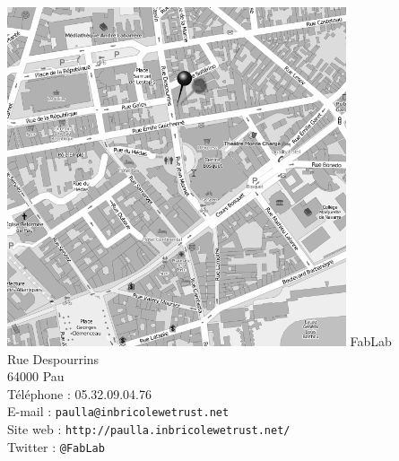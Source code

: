 \begin{center}
  \vfill
  \includegraphics[width=10cm]{carte.png}
  \vfill
  FabLab\\
  Rue Despourrins\\
  64000 Pau\\
  \vfill
  \medskip Téléphone : 05.32.09.04.76\\ %
  \medskip E-mail : \texttt{paulla@inbricolewetrust.net}\\%
  \medskip Site web : \texttt{http://paulla.inbricolewetrust.net/}\\%
  \medskip Twitter : \texttt{@FabLab}
  \vfill
\end{center}
